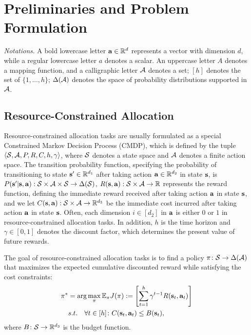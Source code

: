 \section{Preliminaries and Problem Formulation}


\textit{Notations.} A bold lowercase letter ${\mathbf{a}} \in\mathbb{R}^d$ represents a vector with dimension $d$, while a regular lowercase letter $a$ denotes a scalar. An uppercase letter $A$ denotes a mapping function, and a calligraphic letter ${\mathcal{A}}$ denotes a set; $[h]$ denotes the set of $\{1, \ldots, h\}$; $\Delta({\mathcal{A}})$ denotes the space of probability distributions supported in ${\mathcal{A}}$.

\subsection{Resource-Constrained Allocation}
Resource-constrained allocation tasks are usually formulated as a special Constrained Markov Decision Process (CMDP), which is defined by the tuple $ \langle {\mathcal{S}}, {\mathcal{A}}, P, R, C, h,\gamma \rangle $, where ${\mathcal{S}}$ denotes a state space and ${\mathcal{A}}$ denotes a finite action space. The transition probability function, specifying the probability of transitioning to state $ {\mathbf{s}}'\in\mathbb{R}^{d_1} $ after taking action ${\mathbf{a}}\in\mathbb{R}^{d_2}$ in state ${\mathbf{s}}$, is $ P({\mathbf{s}}' | {\mathbf{s}}, {\mathbf{a}}):{\mathcal{S}} \times {\mathcal{A}} \times {\mathcal{S}} \to \Delta({\mathcal{S}}) $,  $ R({\mathbf{s}}, {\mathbf{a}}):{\mathcal{S}} \times {\mathcal{A}} \to \mathbb{R}$ represents the reward function, defining the immediate reward received after taking action ${\mathbf{a}}$ in state ${\mathbf{s}}$, and we let $C({\mathbf{s}}, {\mathbf{a}}): {\mathcal{S}} \times {\mathcal{A}} \to \mathbb{R}^{d_3}$ be the immediate cost incurred after taking action ${\mathbf{a}}$ in state ${\mathbf{s}}$. Often, each dimension $i\in[d_2]$ in ${\mathbf{a}}$ is either $0$ or $1$ in resource-constrained allocation tasks. In addition, $h$ is the time horizon and $ \gamma \in [0, 1] $ denotes the discount factor, which determines the present value of future rewards.


The goal of resource-constrained allocation tasks is to find a policy $\pi\colon {\mathcal{S}} \to \Delta({\mathcal{A}})$ that maximizes the expected cumulative discounted reward while satisfying the cost constraints:
\begin{align}\label{eq:RCA_objective}
    \pi^* &= \arg\max_\pi \mathbb{E}_\pi J(\pi):=\left[ \sum_{t=1}^h \gamma^{t-1} R({\mathbf{s}}_t, {\mathbf{a}}_t) \right]\nonumber\\
    & s.t. ~~~\forall t\in [h]\colon C({\mathbf{s}}_t, {\mathbf{a}}_t) \leq B({\mathbf{s}}_t),
\end{align}
where $B\colon {\mathcal{S}} \to \mathbb{R}^{d_3}$ is the budget function.







